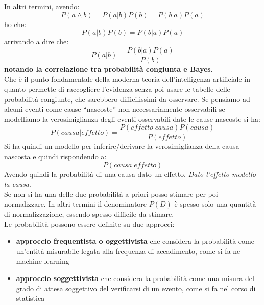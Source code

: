\message{ !name(modprob.tex)}\documentclass[a4paper,12pt, oneside]{book}
\begin{document}
In altri termini, avendo:
\[P(a\land b)=P(a|b)P(b)=P(b|a)P(a)\]
ho che:
\[P(a|b)P(b)=P(b|a)P(a)\]
arrivando a dire che:
\[P(a|b)=\frac{P(b|a)P(a)}{P(b)}\]
\textbf{notando la correlazione tra probabilità congiunta e Bayes}.\\
Che è il punto fondamentale della moderna teoria dell'intelligenza artificiale
in quanto permette di raccogliere l'evidenza senza poi usare le tabelle delle
probabilità congiunte, che sarebbero difficilissimi da osservare.
Se pensiamo ad alcuni eventi come cause ``nascoste'' non necessariamente
osservabili se modelliamo la verosimiglianza degli eventi osservabili date le
cause nascoste si ha:
\[P(causa|effetto)=\frac{P(effetto|causa)P(causa)}{P(effetto)}\]
Si ha quindi un modello per inferire/derivare la verosimiglianza della causa
nascosta e quindi rispondendo a:
\[P(causa|effetto)\]
Avendo quindi la probabilità di una causa dato un effetto.
\textit{Dato l'effetto modello la causa}.\\
Se non si ha una delle due probabilità a priori posso stimare per poi
normalizzare. In altri termini il denominatore $P(D)$ è spesso solo una quantità
di normalizzazione, essendo spesso difficile da stimare. \\
Le probabilità possono essere definite su due approcci:
\begin{itemize}
  \item \textbf{approccio frequentista o oggettivista} che considera la
  probabilità come un'entità misurabile legata alla frequenza di accadimento,
  come si fa ne machine learning
  \item \textbf{approccio soggettivista} che considera la
  probabilità come una misura del grado di attesa soggettivo del verificarsi di
  un evento, come si fa nel corso di statistica
\end{itemize}
\end{document}
